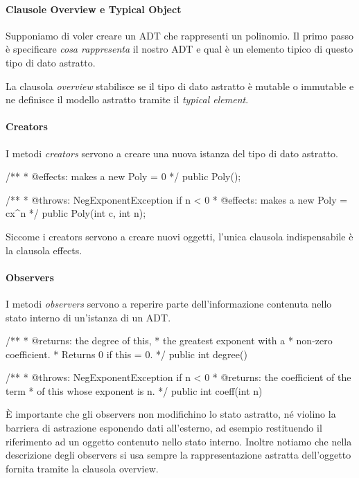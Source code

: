 \paragraph{Clausole Overview e Typical Object}
Supponiamo di voler creare un ADT che rappresenti un polinomio. Il primo passo è specificare \emph{cosa rappresenta} il nostro ADT e qual è un elemento tipico di questo tipo di dato astratto.
\begin{Java}
    /**
      * A Poly is an immutable polynomial with integer coefficient.
      * A typical element is 
      *          c_0 + c_1x + c_2x^2 + ...  
      */
    public class Poly { ...
\end{Java}
La clausola \emph{overview} stabilisce se il tipo di dato astratto è mutable o immutable e ne definisce il modello astratto tramite il \emph{typical element}.

\paragraph{Creators}
I metodi \emph{creators} servono a creare una nuova istanza del tipo di dato astratto.
\begin{Java}
    /**
     * @effects: makes a new Poly = 0
     */
    public Poly();

    /**
     * @throws: NegExponentException if n < 0
     * @effects: makes a new Poly = cx^n
     */
    public Poly(int c, int n);
\end{Java}
Siccome i creators servono a creare nuovi oggetti, l'unica clausola indispensabile è la clausola effects.

\paragraph{Observers}
I metodi \emph{observers} servono a reperire parte dell'informazione contenuta nello stato interno di un'istanza di un ADT.
\begin{Java}
    /**
     * @returns: the degree of this,
     *      the greatest exponent with a
     *      non-zero coefficient.
     *      Returns 0 if this = 0. 
     */
    public int degree() { }

    /**
     * @throws: NegExponentException if n < 0
     * @returns: the coefficient of the term
     *      of this whose exponent is n.
     */
    public int coeff(int n) { }
\end{Java}
È importante che gli observers non modifichino lo stato astratto, né violino la barriera di astrazione esponendo dati all'esterno, ad esempio restituendo il riferimento ad un oggetto contenuto nello stato interno. Inoltre notiamo che nella descrizione degli observers si usa sempre la rappresentazione astratta dell'oggetto fornita tramite la clausola overview.

